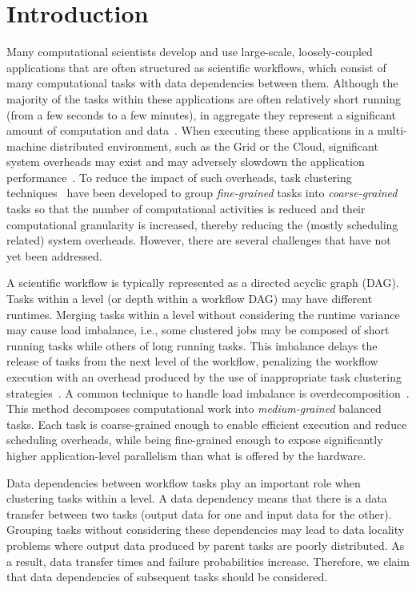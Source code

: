 \documentclass[final,5p,times,twocolumn]{elsarticle}
\begin{document}
\section{Introduction}
\label{intro}
Many computational scientists develop and use large-scale, loosely-coupled applications that are often structured as scientific workflows, which consist of many computational tasks with data dependencies between them. Although the majority of the tasks within these applications are often relatively short running (from a few seconds to a few minutes), in aggregate they represent a significant amount of computation and data~\cite{daSilva:2013:TFO:2534248.2534254,Juve2013}. When executing these applications in a multi-machine distributed environment, such as the Grid or the Cloud, significant system overheads may exist and may adversely slowdown the application performance~\cite{Chen2011}. To reduce the impact of such overheads, task clustering techniques~\cite{Muthuvelu:2005:DJG:1082290.1082297,4493929,Muthuvelu2010,Muthuvelu2013170,keat-2006,ang-2009,Liu2009,Singh:2008:WTC:1341811.1341822,Ferreira-granularity-2013} have been developed to group \emph{fine-grained} tasks into \emph{coarse-grained} tasks so that the number of computational activities is reduced and their computational granularity is increased, thereby reducing the (mostly scheduling related) system overheads.
However, there are several challenges that have not yet been addressed.

A scientific workflow is typically represented as a directed acyclic graph (DAG). Tasks within a level (or depth within a workflow DAG) may have different runtimes. Merging tasks within a level without considering the runtime variance may cause load imbalance, i.e., some clustered jobs may be composed of short running tasks while others of long running tasks. This imbalance delays the release of tasks from the next level of the workflow, penalizing the workflow execution with an overhead produced by the use of inappropriate task clustering strategies~\cite{Chen2013}.
A common technique to handle load imbalance is overdecomposition~\cite{Lifflander}.
This method decomposes computational work into \emph{medium-grained} balanced tasks. Each task is coarse-grained enough to enable efficient execution and reduce scheduling overheads, while being fine-grained enough to expose significantly higher application-level parallelism than what is offered by the hardware. 

Data dependencies between workflow tasks play an important role when clustering tasks within a level. A data dependency means that there is a data transfer between two tasks (output data for one and input data for the other). Grouping tasks without considering these dependencies may lead to data locality problems where output data produced by parent tasks are poorly distributed. As a result, data transfer times and failure probabilities increase.
Therefore, we claim that data dependencies of subsequent tasks should be considered.
\end{document}
